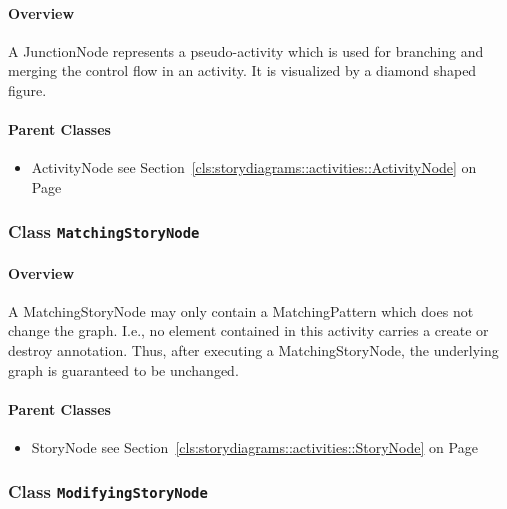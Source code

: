 \paragraph{Overview}

	
			
A JunctionNode represents a pseudo-activity which is used for branching and merging the control flow in an activity. It is visualized by a diamond shaped figure.	
		
	



\paragraph{Parent Classes}
\begin{itemize}
\item ActivityNode see Section~\ref{cls:storydiagrams::activities::ActivityNode} on Page~\pageref{cls:storydiagrams::activities::ActivityNode}\end{itemize}
\subsubsection{\Large{Class \bfseries \texttt{MatchingStoryNode}\normalfont}}
\label{cls:storydiagrams::activities::MatchingStoryNode} 
\paragraph{Overview}

	
			
A MatchingStoryNode may only contain a MatchingPattern which does not change the graph. I.e., no element contained in this activity carries a create or destroy annotation. Thus, after executing a MatchingStoryNode, the underlying graph is guaranteed to be unchanged.	
		
	



\paragraph{Parent Classes}
\begin{itemize}
\item StoryNode see Section~\ref{cls:storydiagrams::activities::StoryNode} on Page~\pageref{cls:storydiagrams::activities::StoryNode}\end{itemize}
\subsubsection{\Large{Class \bfseries \texttt{ModifyingStoryNode}\normalfont}}
\label{cls:storydiagrams::activities::ModifyingStoryNode} 
